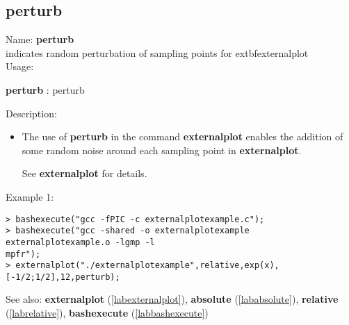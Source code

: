 \subsection{perturb}
\label{labperturb}
\noindent Name: \textbf{perturb}\\
indicates random perturbation of sampling points for 	extbf{externalplot}\\
\noindent Usage: 
\begin{center}
\textbf{perturb} : \textsf{perturb}
\end{center}
\noindent Description: \begin{itemize}

\item The use of \textbf{perturb} in the command \textbf{externalplot} enables the addition
   of some random noise around each sampling point in \textbf{externalplot}.
    
   See \textbf{externalplot} for details.
\end{itemize}
\noindent Example 1: 
\begin{center}\begin{minipage}{15cm}\begin{Verbatim}[frame=single]
> bashexecute("gcc -fPIC -c externalplotexample.c");
> bashexecute("gcc -shared -o externalplotexample externalplotexample.o -lgmp -l
mpfr");
> externalplot("./externalplotexample",relative,exp(x),[-1/2;1/2],12,perturb);
\end{Verbatim}
\end{minipage}\end{center}
See also: \textbf{externalplot} (\ref{labexternalplot}), \textbf{absolute} (\ref{lababsolute}), \textbf{relative} (\ref{labrelative}), \textbf{bashexecute} (\ref{labbashexecute})
